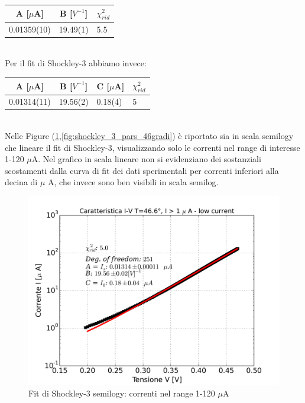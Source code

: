 \documentclass[10pt,letterpaper]{article}
\begin{document}
\begin{table}[h]
\centering
\begin{tabular}{c|c|l}
 \textbf{A} [$\mu$A] & \textbf{B} [$V^{-1}$] & $\chi_{rid}^2$\\ 
\hline 0.01359(10) & 19.49(1) & 5.5 \\ 
\end{tabular} 
\end{table}
~\\

Per il fit di Shockley-3 abbiamo invece:

\begin{table}[h]
\centering
\begin{tabular}{c|c|l|l}
 \textbf{A} [$\mu$A] & \textbf{B} [$V^{-1}$] & \textbf{C} [$\mu$A]  & $\chi_{rid}^2$\\ 
\hline 0.01314(11) & 19.56(2) & 0.18(4) & 5 \\
\end{tabular} 
\end{table}
~\\

Nelle Figure (\ref{fig:shockley_3_pars_46gradi_semilogy},\ref{fig:shockley_3_pars_46gradi}) è riportato sia in scala semilogy che lineare il fit di Shockley-3, visualizzando solo le correnti nel range di interesse 1-120 $\mu$A. Nel grafico in scala lineare non si evidenziano dei sostanziali scostamenti dalla curva di fit dei dati sperimentali per correnti inferiori alla decina di $\mu$ A, che invece sono ben visibili in scala semilog.\\

\begin{figure}
\centering
\includegraphics[width=0.9\linewidth]{./shockley_3_pars_46gradi_semilogy}
\caption{Fit di Shockley-3 semilogy: correnti nel range 1-120 $\mu$A}
\label{fig:shockley_3_pars_46gradi_semilogy}
\end{figure}
\end{document}
